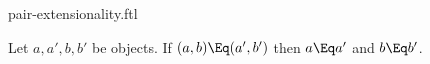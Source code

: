 \documentclass{stex}
\begin{document}
\begin{smodule}{pair-extensionality.ftl}


\begin{forthel}
  \begin{axiom}
    Let $a,a',b,b'$ be objects.
    If $(a, b) \Eq (a', b')$ then $a \Eq a'$ and $b \Eq b'$.
  \end{axiom}
\end{forthel}

\end{smodule}
\end{document}

